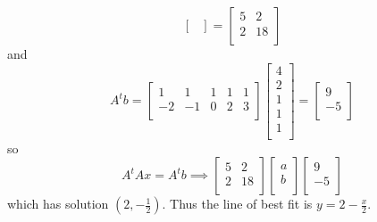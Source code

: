 \documentclass{article}
\begin{document}
\begin{example}
\[\begin{bmatrix}
        \end{bmatrix} =
        \begin{bmatrix}
          5 & 2\\
          2 & 18\\
        \end{bmatrix}
      \] and \[
        A^tb =
        \begin{bmatrix}
          1 & 1 & 1 & 1 & 1\\
          -2 & -1 & 0 & 2 & 3\\
        \end{bmatrix}
        \begin{bmatrix}
          4\\2\\1\\1\\1\\
        \end{bmatrix} =
        \begin{bmatrix}
          9\\-5\\
        \end{bmatrix}
      \] so \[
        A^tAx = A^tb \implies
        \begin{bmatrix}
          5 & 2\\
          2 & 18\\
        \end{bmatrix}
        \begin{bmatrix}
          a\\b\\
        \end{bmatrix}
        \begin{bmatrix}
          9\\-5\\
        \end{bmatrix}
      \] which has solution $(2, -\frac{1}{2})$. Thus the line of best fit is $y = 2 - \frac{x}{2}$.


\end{example}
\end{document}
